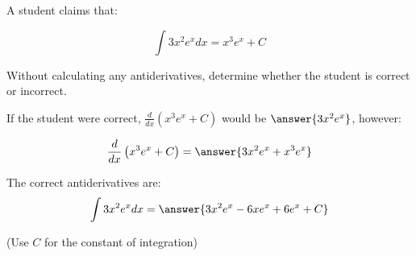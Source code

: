 \documentclass{ximera}
\author{Jim Talamo}
\begin{document}
\begin{exercise}
A student claims that:

\[
\int 3x^2 e^{x} dx =x^3 e^{x} +C
\]

Without calculating any antiderivatives, determine whether the student is correct or incorrect. 

\begin{multipleChoice}
\end{multipleChoice}

If the student were correct, $\frac{d}{dx} \left(x^3 e^{x} +C\right)$ would be $\answer{3x^2 e^{x}}$, however:

\[
\frac{d}{dx} \left(x^3 e^{x} +C\right) = \answer{3x^2e^x+x^3e^x}
\]

\begin{exercise}
The correct antiderivatives are:
\[
\int 3x^2 e^x dx = \answer{3x^2e^x-6xe^x+6e^x +C}
\]

(Use $C$ for the constant of integration)
\end{exercise}
\end{exercise}
\end{document}
